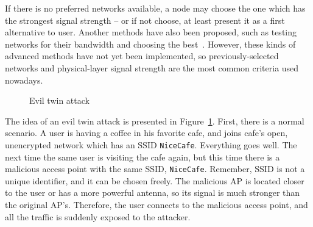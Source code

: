 \documentclass[12pt,a4paper,oneside,pdftex]{report}
\begin{document}
If there is no preferred networks available, a node may choose the one which has the strongest signal strength -- or if not choose, at least present it as a first alternative to user. Another methods have also been proposed, such as testing networks for their bandwidth and choosing the best~\cite{Nicholson:2006:APselection}. However, these kinds of advanced methods have not yet been implemented, so previously-selected networks and physical-layer signal strength are the most common criteria used nowadays.

\begin{figure}
    \begin{center}
    \caption{Evil twin attack}
    \label{fig:evil_twin}
    \end{center}
\end{figure}

The idea of an evil twin attack is presented in Figure~\ref{fig:evil_twin}. First, there is a normal scenario. A user is having a coffee in his favorite cafe, and joins cafe's open, unencrypted network which has an SSID \texttt{NiceCafe}. Everything goes well. The next time the same user is visiting the cafe again, but this time there is a malicious access point with the same SSID, \texttt{NiceCafe}. Remember, SSID is not a unique identifier, and it can be chosen freely. The malicious AP is located closer to the user or has a more powerful antenna, so its signal is much stronger than the original AP's. Therefore, the user connects to the malicious access point, and all the traffic is suddenly exposed to the attacker.
\end{document}
